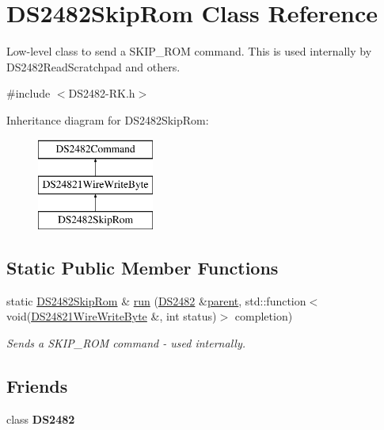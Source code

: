 \hypertarget{class_d_s2482_skip_rom}{}\section{D\+S2482\+Skip\+Rom Class Reference}
\label{class_d_s2482_skip_rom}


Low-\/level class to send a S\+K\+I\+P\+\_\+\+R\+OM command. This is used internally by D\+S2482\+Read\+Scratchpad and others.  




{\ttfamily \#include $<$D\+S2482-\/\+R\+K.\+h$>$}

Inheritance diagram for D\+S2482\+Skip\+Rom\+:\begin{figure}[H]
\begin{center}
\leavevmode
\includegraphics[height=3.000000cm]{class_d_s2482_skip_rom}
\end{center}
\end{figure}
\subsection*{Static Public Member Functions}
\begin{DoxyCompactItemize}
\item 
\mbox{\label{class_d_s2482_skip_rom_a83c24bab7c454912e818aeacba765588}} 
static \mbox{\hyperlink{class_d_s2482_skip_rom}{D\+S2482\+Skip\+Rom}} \& \mbox{\hyperlink{class_d_s2482_skip_rom_a83c24bab7c454912e818aeacba765588}{run}} (\mbox{\hyperlink{class_d_s2482}{D\+S2482}} \&\mbox{\hyperlink{class_d_s2482_command_a54a41fb8a610ef2077f5e5377771aaf3}{parent}}, std\+::function$<$ void(\mbox{\hyperlink{class_d_s24821_wire_write_byte}{D\+S24821\+Wire\+Write\+Byte}} \&, int status)$>$ completion)
\begin{DoxyCompactList}\small\item\em Sends a S\+K\+I\+P\+\_\+\+R\+OM command -\/ used internally. \end{DoxyCompactList}\end{DoxyCompactItemize}
\subsection*{Friends}
\begin{DoxyCompactItemize}
\item 
\mbox{\label{class_d_s2482_skip_rom_afeaf69274324e8dbeebede05c02d9c18}} 
class {\bfseries D\+S2482}
\end{DoxyCompactItemize}
